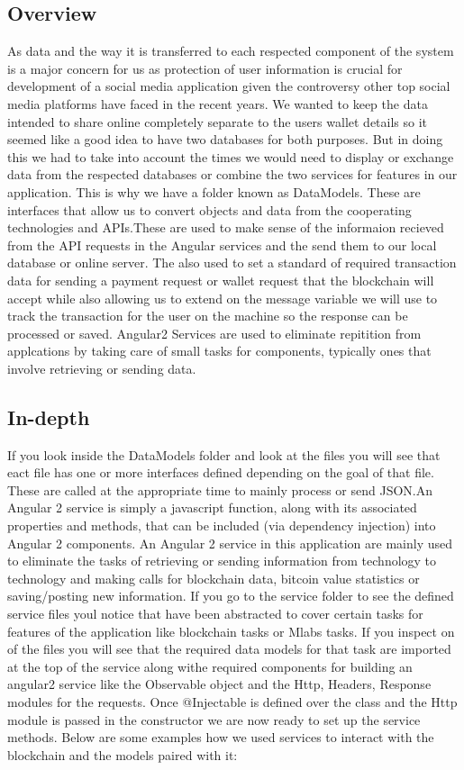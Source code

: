 \subsection{Overview}
As data and the way it is transferred to each respected component of the system is a major concern for us as protection of user information is crucial for development of a social media application given the controversy other top social media platforms have faced in the recent years. We wanted to keep the data intended to share online completely separate to the users wallet details so it seemed like a good idea to have two databases for both purposes. But in doing this we had to take into account the times we would need to display or exchange data from the respected databases or combine the two services for features in our application. This is why we have a folder known as DataModels. These are interfaces that allow us to convert objects and data from the cooperating technologies and APIs.These are used to make sense of the informaion recieved from the API requests in the Angular services and the send them to our local database or online server. The also used to set a standard of required transaction data for sending a payment request or wallet request that the blockchain will accept while also allowing us to extend on the message variable we will use to track the transaction for the user on the machine so the response can be processed or saved. Angular2 Services are used to eliminate repitition from applcations by taking care of small tasks for components, typically ones that involve retrieving or sending data.

\subsection{In-depth}
If you look inside the DataModels folder and look at the files you will see that eact file has one or more interfaces defined depending on the goal of that file. These are called at the appropriate time to mainly process or send JSON.An Angular 2 service is simply a javascript function, along with its associated properties and methods, that can be included (via dependency injection) into Angular 2 components. An Angular 2 service in this application are mainly used to eliminate the tasks of retrieving or sending information from technology to technology and making calls for blockchain data, bitcoin value statistics or saving/posting new information. If you go to the service folder to see the defined service files youl notice that have been abstracted to cover certain tasks for features of the application like blockchain tasks or Mlabs tasks. If you inspect on of the files you will see that the required data models for that task are imported at the top of the service along withe required components for building an angular2 service like the Observable object and the Http, Headers, Response modules for the requests. Once @Injectable is defined over the class and the Http module is passed in the constructor we are now ready to set up the service methods. Below are some examples how we used services to interact with the blockchain and the models paired with it:

